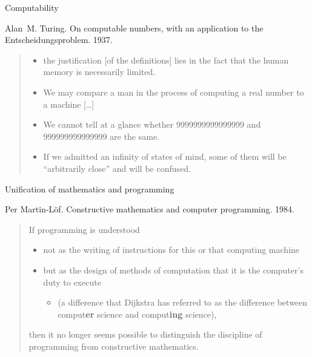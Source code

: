\documentclass[t,compress,hyperref={hidelinks}]{beamer}
\begin{document}
\begin{frame}{Computability}

Alan~M. Turing. On computable numbers, with an application to the Entscheidungsproblem. 1937.

\begin{quote}
\normalfont
\begin{itemize}
\item\relax [\ldots] the justification [of the definitions] lies in the fact that the human memory is necessarily limited.
\vspace*{1ex}
\item We may compare a man in the process of computing a real number to a machine [\ldots]
\vspace*{1ex}
\item{} We cannot tell at a glance whether 9999999999999999 and 999999999999999 are the same.
\vspace*{1ex}
\item{} If we admitted an infinity of states of mind, some of them will be ``arbitrarily close'' and will be confused.
\end{itemize}
\end{quote}

\end{frame}

\begin{frame}{Unification of mathematics and programming}

Per Martin-Löf. Constructive mathematics and computer programming. 1984.

\begin{quote}
\normalfont
If programming is understood
\vspace*{1ex}
\begin{itemize}
\item not as the writing of instructions for this or that computing machine
\vspace*{1ex}
\item but as the design of methods of computation that it is the computer's duty to execute
\vspace*{1ex}
\begin{itemize}
\item (a difference that Dijkstra has referred to as the difference between comput\textbf{er} science and comput\textbf{ing} science),
\end{itemize}
\end{itemize}
\vspace*{1ex}
then it no longer seems possible to distinguish the discipline of programming from constructive mathematics.
\end{quote}

\end{frame}
\end{document}
